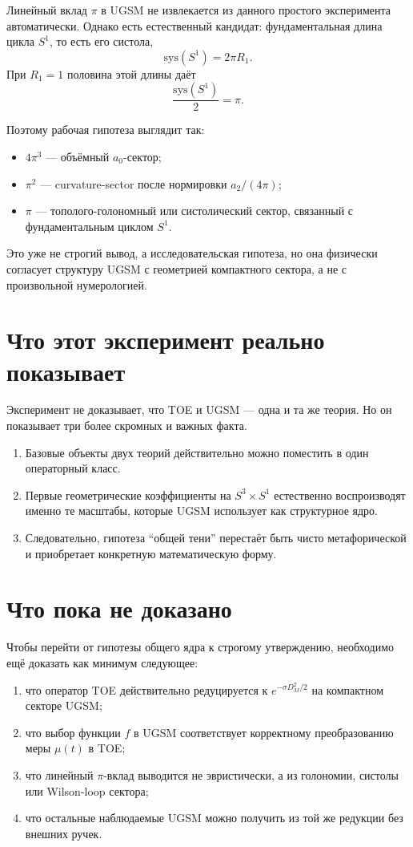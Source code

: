 \documentclass[12pt,a4paper]{article}
\begin{document}
Линейный вклад \(\pi\) в UGSM не извлекается из данного простого эксперимента автоматически. Однако есть естественный кандидат: фундаментальная длина цикла \(S^1\), то есть его систола,
\[
\mathrm{sys}(S^1)=2\pi R_1.
\]
При \(R_1=1\) половина этой длины даёт
\[
\frac{\mathrm{sys}(S^1)}{2}=\pi.
\]

Поэтому рабочая гипотеза выглядит так:
\begin{itemize}
    \item \(4\pi^3\) --- объёмный \(a_0\)-сектор;
    \item \(\pi^2\) --- curvature-sector после нормировки \(a_2/(4\pi)\);
    \item \(\pi\) --- тополого-голономный или систолический сектор, связанный с фундаментальным циклом \(S^1\).
\end{itemize}

Это уже не строгий вывод, а исследовательская гипотеза, но она физически согласует структуру UGSM с геометрией компактного сектора, а не с произвольной нумерологией.

\section{Что этот эксперимент реально показывает}

Эксперимент не доказывает, что TOE и UGSM --- одна и та же теория. Но он показывает три более скромных и важных факта.

\begin{enumerate}
    \item Базовые объекты двух теорий действительно можно поместить в один операторный класс.
    \item Первые геометрические коэффициенты на \(S^3 \times S^1\) естественно воспроизводят именно те масштабы, которые UGSM использует как структурное ядро.
    \item Следовательно, гипотеза ``общей тени'' перестаёт быть чисто метафорической и приобретает конкретную математическую форму.
\end{enumerate}

\section{Что пока не доказано}

Чтобы перейти от гипотезы общего ядра к строгому утверждению, необходимо ещё доказать как минимум следующее:
\begin{enumerate}
    \item что оператор TOE действительно редуцируется к \(e^{-\sigma D_M^2/2}\) на компактном секторе UGSM;
    \item что выбор функции \(f\) в UGSM соответствует корректному преобразованию меры \(\mu(t)\) в TOE;
    \item что линейный \(\pi\)-вклад выводится не эвристически, а из голономии, систолы или Wilson-loop сектора;
    \item что остальные наблюдаемые UGSM можно получить из той же редукции без внешних ручек.
\end{enumerate}
\end{document}
